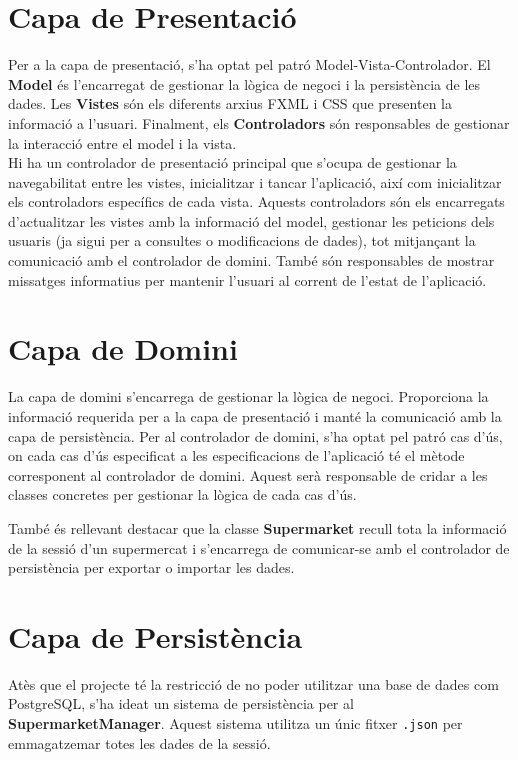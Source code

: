 \documentclass[a4paper,12pt]{report}
\begin{document}
\begin{itemize}
\section{Capa de Presentació}

Per a la capa de presentació, s'ha optat pel patró Model-Vista-Controlador. El \textbf{Model} és l'encarregat de gestionar la lògica de negoci i la persistència de les dades. Les \textbf{Vistes} són els diferents arxius FXML i CSS que presenten la informació a l'usuari. Finalment, els \textbf{Controladors} són responsables de gestionar la interacció entre el model i la vista. \\

Hi ha un controlador de presentació principal que s'ocupa de gestionar la navegabilitat entre les vistes, inicialitzar i tancar l'aplicació, així com inicialitzar els controladors específics de cada vista. Aquests controladors són els encarregats d'actualitzar les vistes amb la informació del model, gestionar les peticions dels usuaris (ja sigui per a consultes o modificacions de dades), tot mitjançant la comunicació amb el controlador de domini. També són responsables de mostrar missatges informatius per mantenir l'usuari al corrent de l'estat de l'aplicació.

\section{Capa de Domini}

La capa de domini s'encarrega de gestionar la lògica de negoci. Proporciona la informació requerida per a la capa de presentació i manté la comunicació amb la capa de persistència. Per al controlador de domini, s'ha optat pel patró cas d'ús, on cada cas d'ús especificat a les especificacions de l'aplicació té el mètode corresponent al controlador de domini. Aquest serà responsable de cridar a les classes concretes per gestionar la lògica de cada cas d'ús.

També és rellevant destacar que la classe \textbf{Supermarket} recull tota la informació de la sessió d'un supermercat i s'encarrega de comunicar-se amb el controlador de persistència per exportar o importar les dades.

\section{Capa de Persistència}

Atès que el projecte té la restricció de no poder utilitzar una base de dades com PostgreSQL, s'ha ideat un sistema de persistència per al \textbf{SupermarketManager}. Aquest sistema utilitza un únic fitxer \texttt{.json} per emmagatzemar totes les dades de la sessió.


\end{itemize}
\end{document}
